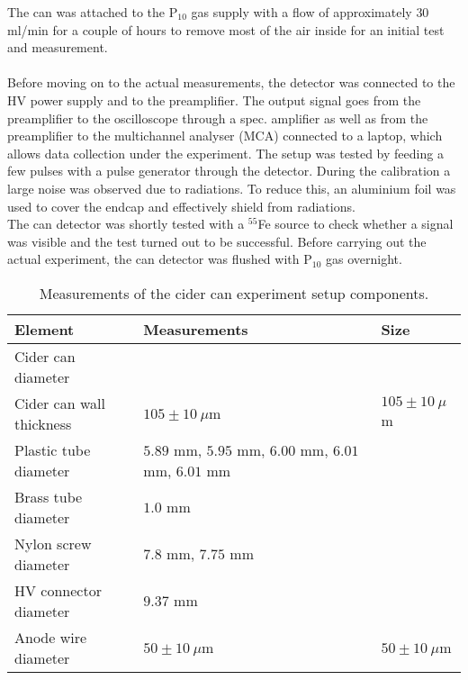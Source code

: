 The can was attached to the P$_{10}$ gas supply with a flow of approximately $30$ ml/min for a couple of hours to remove most of the air inside for an initial test and measurement. \\ \\
Before moving on to the actual measurements, the detector was connected to the HV power supply and to the preamplifier. The output signal goes from the preamplifier to the oscilloscope through a spec. amplifier as well as from the preamplifier to the multichannel analyser (MCA) connected to a laptop, which allows data collection under the experiment. The setup was tested by feeding a few pulses with a pulse generator through the detector. During the calibration a large noise was observed due to radiations. To reduce this, an aluminium foil was used to cover the endcap and effectively shield from radiations. \\
The can detector was shortly tested with a $^{55}$Fe source to check whether a signal was visible and the test turned out to be successful. Before carrying out the actual experiment, the can detector was flushed with P$_{10}$ gas overnight.


\begin{table}[]
	\begin{tabular}{l|l|l}
			Element                  & Measurements                                          & Size                \\ \hline
			Cider can diameter       &                                                       &                     \\
			Cider can wall thickness & $105 \pm 10 \ \mu$m                                   & $105 \pm 10 \ \mu$m \\
			Plastic tube diameter    & $5.89$ mm, $5.95$ mm, $6.00$ mm, $6.01$ mm, $6.01$ mm &                     \\
			Brass tube diameter      & $1.0$ mm                                              &                     \\
			Nylon screw diameter     & $7.8$ mm, $7.75$ mm                                   &                     \\
			HV connector diameter    & $9.37$ mm                                             &                     \\
			Anode wire diameter      & $50 \pm 10 \ \mu$m                                    & $50 \pm 10 \ \mu$m 
	\end{tabular}
\caption{Measurements of the cider can experiment setup components.}
\label{Tab:cidercan_sizes}
\end{table}



